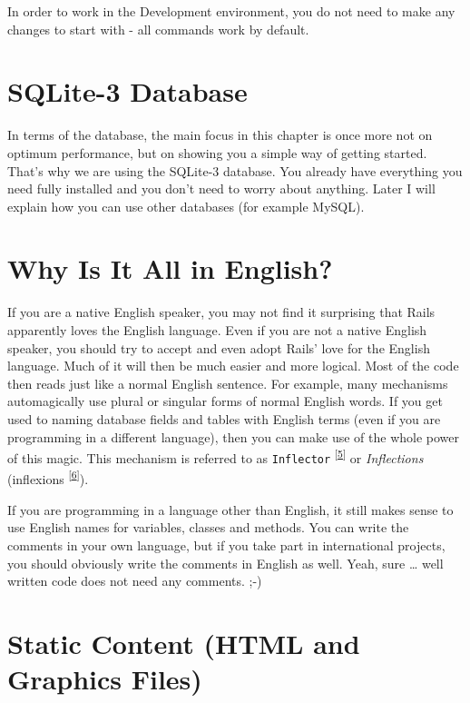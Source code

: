 \documentclass[a4paper]{book}
\newcounter{tab}[chapter]
\begin{document}
In order to work in the Development environment, you do not need to make any changes to start with - all commands work by default.

\section{SQLite-3 Database}\label{sqlite-3-database}

In terms of the database, the main focus in this chapter is once more not on optimum performance, but on showing you a simple way of getting started. That's why we are using the SQLite-3 database. You already have everything you need fully installed and you don't need to worry about anything. Later I will explain how you can use other databases (for example MySQL).

\section{Why Is It All in English?}\label{why-is-it-all-in-english}

If you are a native English speaker, you may not find it surprising that Rails apparently loves the English language. Even if you are not a native English speaker, you should try to accept and even adopt Rails' love for the English language. Much of it will then be much easier and more logical. Most of the code then reads just like a normal English sentence. For example, many mechanisms automagically use plural or singular forms of normal English words. If you get used to naming database fields and tables with English terms (even if you are programming in a different language), then you can make use of the whole power of this magic. This mechanism is referred to as \texttt{Inflector} \textsuperscript{{[}\hyperref[ftn.idp1626704]{5}{]}} or \emph{Inflections} (inflexions \textsuperscript{{[}\hyperref[ftn.idp1628816]{6}{]}}).

If you are programming in a language other than English, it still makes sense to use English names for variables, classes and methods. You can write the comments in your own language, but if you take part in international projects, you should obviously write the comments in English as well. Yeah, sure \ldots{} well written code does not need any comments. ;-)

\section{Static Content (HTML and Graphics Files)}\label{static-content-html-and-graphics-files}
\end{document}
